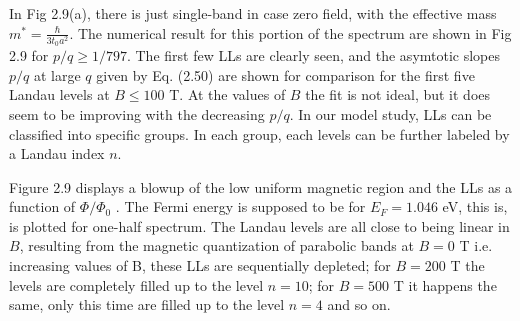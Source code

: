 \documentclass{report}
\begin{document}
In Fig 2.9(a), there is just single-band in case zero field, with the effective mass $m^{*} = \frac{\hbar}{3 t_{0} a^{2}}$. The numerical result for this portion of the spectrum are shown in Fig 2.9 for $p/q \geq 1/797$. The first few LLs are clearly seen, and the asymtotic slopes $p/q$ at large $q$ given by Eq. (2.50) are shown for comparison for the first five Landau levels at $B \leq 100$ T. At the values of $B$ the fit is not ideal, but it does seem to be improving with the decreasing $p/q$. In our model study, LLs can be classified into specific groups. In each group, each levels can be further labeled by a Landau index $n$.

Figure 2.9 displays a blowup of the low uniform magnetic region and the LLs as a function of $\Phi / \Phi_{0}$ \cite{Li_2011}. The Fermi energy is supposed to be for $E_{F} = 1.046$ eV, this is, is plotted for one-half spectrum. The Landau levels are all close to being linear in $B$, resulting from the magnetic quantization of parabolic bands at $B = 0$ T i.e. increasing values of B, these LLs are sequentially depleted; for $B=200$ T the levels are completely filled up to the level $n=10$; for $B = 500$ T it happens the same, only this time are filled up to the level $n=4$ and so on.

%
%
\end{document}
